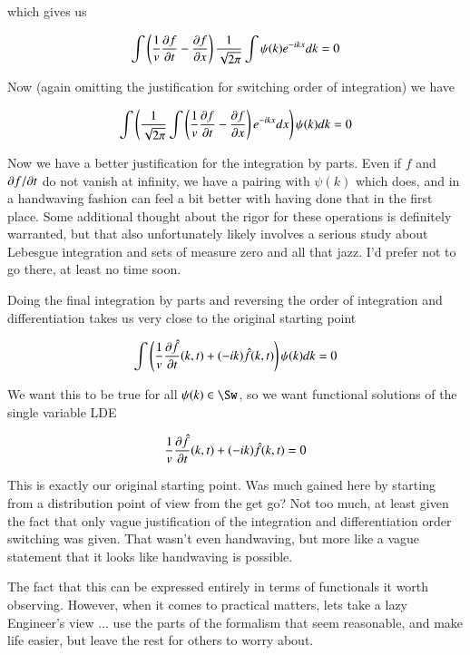 which gives us

\begin{align*}
\int \left( \inv{v} \PD{t}{f} - \PD{x}{f} \right) \inv{\sqrt{2\pi}} \int \psi(k) e^{-i k x} dk = 0
\end{align*}

Now (again omitting the justification for switching order of integration) we have

\begin{align*}
\int \left( \inv{\sqrt{2\pi}} \int \left( \inv{v} \PD{t}{f} - \PD{x}{f} \right) e^{-i k x} dx \right) \psi(k) dk = 0
\end{align*}

Now we have a better justification for the integration by parts.  Even if $f$ and $\PDi{t}{f}$ do not vanish at infinity, we have a pairing with $\psi(k)$ which does, and
in a handwaving fashion can feel a bit better with having done that in the first place.  Some additional thought about the rigor for these operations is definitely warranted, but
that also unfortunately likely involves a serious study about Lebesgue integration and sets of measure zero and all that jazz.  I'd prefer not to go there, at least no time
soon.

Doing the final integration by parts and reversing the order of integration and differentiation takes us very close to the original starting point

\begin{align*}
\int \left( \inv{v} \PD{t}{\hat{f}}(k,t) + (-i k ) \hat{f}(k,t) \right) \psi(k) dk = 0
\end{align*}

We want this to be true for all $\psi(k) \in \Sw$, so we want functional solutions of the single variable LDE

\begin{align*}
\inv{v} \PD{t}{\hat{f}}(k,t) + (-i k ) \hat{f}(k,t) = 0
\end{align*}

This is exactly our original starting point.  Was much gained here by starting from a distribution point of view from the get go?  Not too much, at least
given the fact that only vague justification of the integration and differentiation order switching was given.  That wasn't even handwaving, but more
like a vague statement that it looks like handwaving is possible.

The fact
that this can be expressed entirely in terms of functionals it worth observing.  However, when it comes to practical matters, lets take a lazy Engineer's view ... use the parts 
of the formalism that seem reasonable, and make life easier, but leave the rest for others to worry about. 

